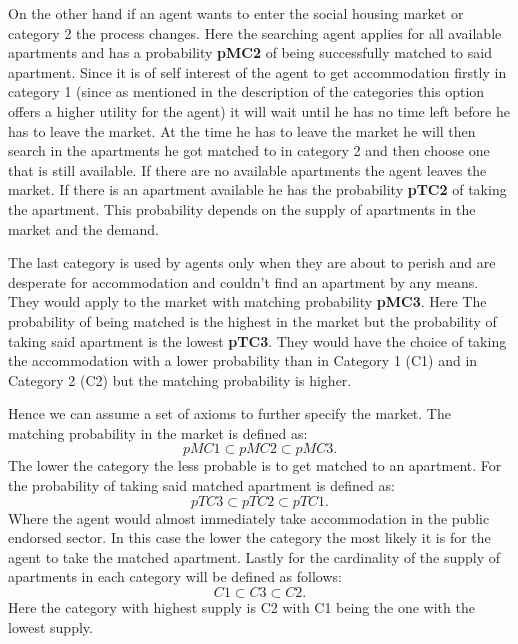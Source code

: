 On the other hand if an agent wants to enter the social housing market or category 2 the process changes. Here the searching agent applies for all available apartments and has a probability \textbf{pMC2} of being successfully matched to said apartment. Since it is of self interest of the agent to get accommodation firstly in category 1 (since as mentioned in the description of the categories this option offers a higher utility for the agent) it will wait until he has no time left before he has to leave the market. At the time he has to leave the market he will then search in the apartments he got matched to in category 2 and then choose one that is still available. If there are no available apartments the agent leaves the market. If there is an apartment available he has the probability \textbf{pTC2} of taking the apartment. This probability depends on the supply of apartments in the market and the demand.

The last category is used by agents only when they are about to perish and are desperate for accommodation and couldn't find an apartment by any means. They would apply to the market with matching probability \textbf{pMC3}. Here The probability of being matched is the highest in the market but the probability of taking said apartment is the lowest \textbf{pTC3}. They would have the choice of taking the accommodation with a lower probability than in Category 1 (C1) and in Category 2 (C2) but the matching probability is higher. 

Hence we can assume a set of  axioms to further specify the market. The matching probability in the market is defined as:
\begin{equation} \label{eq2}
pMC1 \subset pMC2 \subset pMC3.
\end{equation} 
The lower the category the less probable is to get matched to an apartment. For the probability of taking said matched apartment is defined as:
\begin{equation} \label{eq3}
pTC3 \subset pTC2 \subset pTC1.
\end{equation}
Where the agent would almost immediately take accommodation in the public endorsed sector. In this case the lower the category the most likely it is for the agent to take the matched apartment. Lastly for the cardinality of the supply of apartments in each category will be defined as follows:
\begin{equation} \label{eq4}
C1 \subset C3 \subset C2.
\end{equation}
Here the category with highest supply is C2 with C1 being the one with the lowest supply.

